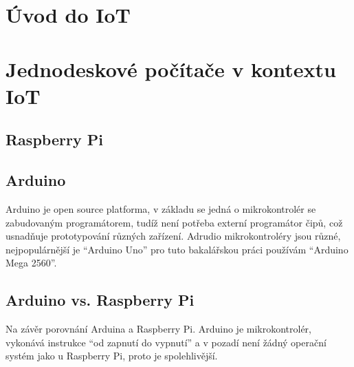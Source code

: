 
\section{Úvod do IoT}

\section{Jednodeskové počítače v kontextu IoT}

\subsection{Raspberry Pi}

\subsection{Arduino}
Arduino je open source platforma, v základu se jedná o mikrokontrolér se zabudovaným programátorem, tudíž není potřeba externí programátor čipů, což usnadňuje prototypování různých zařízení. Adrudio mikrokontroléry jsou různé, nejpopulárnější je “Arduino Uno” pro tuto bakalářskou práci používám “Arduino Mega 2560”.

\subsection{Arduino vs. Raspberry Pi}
Na závěr porovnání Arduina a Raspberry Pi. Arduino je mikrokontrolér, vykonává instrukce “od zapnutí do vypnutí” a v pozadí není žádný operační systém jako u Raspberry Pi, proto je spolehlivější.




